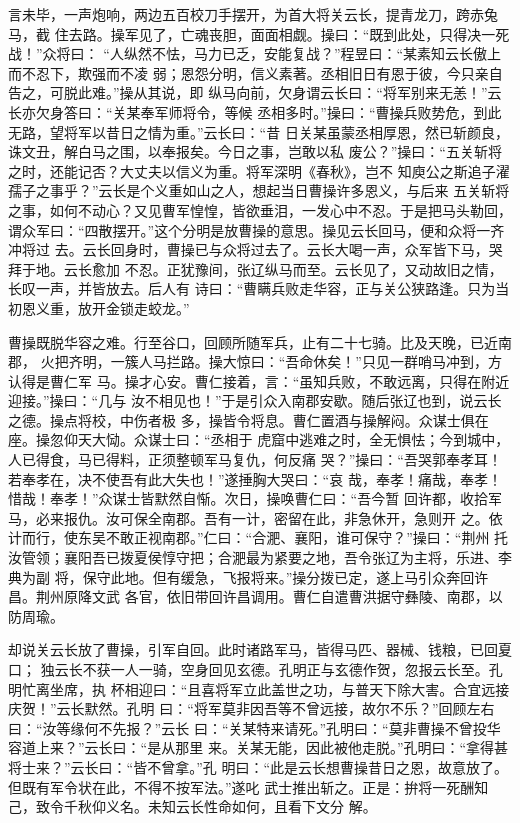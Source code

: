 言未毕，一声炮响，两边五百校刀手摆开，为首大将关云长，提青龙刀，跨赤兔马，截
住去路。操军见了，亡魂丧胆，面面相觑。操曰：“既到此处，只得决一死战！”众将曰：
“人纵然不怯，马力已乏，安能复战？”程昱曰：“某素知云长傲上而不忍下，欺强而不凌
弱；恩怨分明，信义素著。丞相旧日有恩于彼，今只亲自告之，可脱此难。”操从其说，即
纵马向前，欠身谓云长曰：“将军别来无恙！”云长亦欠身答曰：“关某奉军师将令，等候
丞相多时。”操曰：“曹操兵败势危，到此无路，望将军以昔日之情为重。”云长曰：“昔
日关某虽蒙丞相厚恩，然已斩颜良，诛文丑，解白马之围，以奉报矣。今日之事，岂敢以私
废公？”操曰：“五关斩将之时，还能记否？大丈夫以信义为重。将军深明《春秋》，岂不
知庾公之斯追子濯孺子之事乎？”云长是个义重如山之人，想起当日曹操许多恩义，与后来
五关斩将之事，如何不动心？又见曹军惶惶，皆欲垂泪，一发心中不忍。于是把马头勒回，
谓众军曰：“四散摆开。”这个分明是放曹操的意思。操见云长回马，便和众将一齐冲将过
去。云长回身时，曹操已与众将过去了。云长大喝一声，众军皆下马，哭拜于地。云长愈加
不忍。正犹豫间，张辽纵马而至。云长见了，又动故旧之情，长叹一声，并皆放去。后人有
诗曰：“曹瞒兵败走华容，正与关公狭路逢。只为当初恩义重，放开金锁走蛟龙。”

曹操既脱华容之难。行至谷口，回顾所随军兵，止有二十七骑。比及天晚，已近南郡，
火把齐明，一簇人马拦路。操大惊曰：“吾命休矣！”只见一群哨马冲到，方认得是曹仁军
马。操才心安。曹仁接着，言：“虽知兵败，不敢远离，只得在附近迎接。”操曰：“几与
汝不相见也！”于是引众入南郡安歇。随后张辽也到，说云长之德。操点将校，中伤者极
多，操皆令将息。曹仁置酒与操解闷。众谋士俱在座。操忽仰天大恸。众谋士曰：“丞相于
虎窟中逃难之时，全无惧怯；今到城中，人已得食，马已得料，正须整顿军马复仇，何反痛
哭？”操曰：“吾哭郭奉孝耳！若奉孝在，决不使吾有此大失也！”遂捶胸大哭曰：“哀
哉，奉孝！痛哉，奉孝！惜哉！奉孝！”众谋士皆默然自惭。次日，操唤曹仁曰：“吾今暂
回许都，收拾军马，必来报仇。汝可保全南郡。吾有一计，密留在此，非急休开，急则开
之。依计而行，使东吴不敢正视南郡。”仁曰：“合淝、襄阳，谁可保守？”操曰：“荆州
托汝管领；襄阳吾已拨夏侯惇守把；合淝最为紧要之地，吾令张辽为主将，乐进、李典为副
将，保守此地。但有缓急，飞报将来。”操分拨已定，遂上马引众奔回许昌。荆州原降文武
各官，依旧带回许昌调用。曹仁自遣曹洪据守彝陵、南郡，以防周瑜。

却说关云长放了曹操，引军自回。此时诸路军马，皆得马匹、器械、钱粮，已回夏口；
独云长不获一人一骑，空身回见玄德。孔明正与玄德作贺，忽报云长至。孔明忙离坐席，执
杯相迎曰：“且喜将军立此盖世之功，与普天下除大害。合宜远接庆贺！”云长默然。孔明
曰：“将军莫非因吾等不曾远接，故尔不乐？”回顾左右曰：“汝等缘何不先报？”云长
曰：“关某特来请死。”孔明曰：“莫非曹操不曾投华容道上来？”云长曰：“是从那里
来。关某无能，因此被他走脱。”孔明曰：“拿得甚将士来？”云长曰：“皆不曾拿。”孔
明曰：“此是云长想曹操昔日之恩，故意放了。但既有军令状在此，不得不按军法。”遂叱
武士推出斩之。正是：拚将一死酬知己，致令千秋仰义名。未知云长性命如何，且看下文分
解。